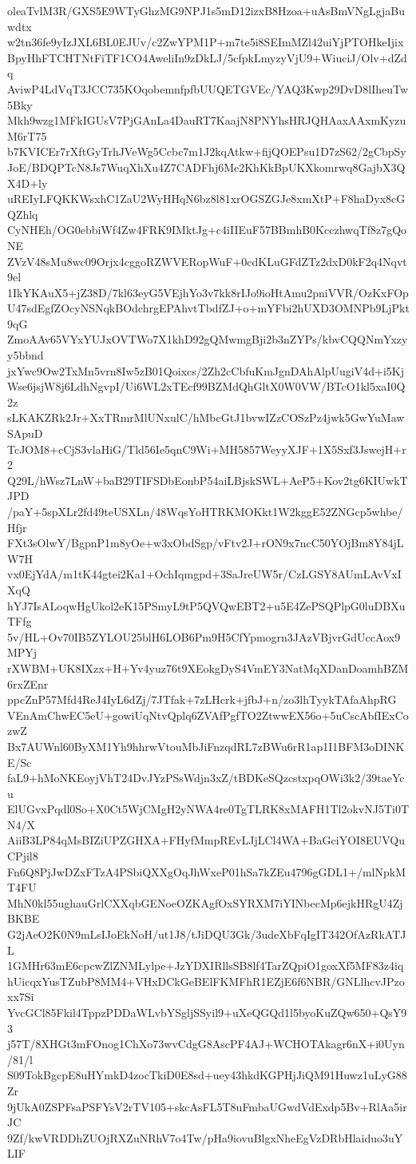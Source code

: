 oleaTvlM3R/GXS5E9WTyGhzMG9NPJ1s5mD12izxB8Hzoa+uAsBmVNgLgjaBuwdtx
w2tn36fe9yIzJXL6BL0EJUv/c2ZwYPM1P+m7te5i8SEImMZl42uiYjPTOHkeIjix
BpyHhFTCHTNtFiTF1CO4AweliIn9zDkLJ/5cfpkLmyzyVjU9+WiuciJ/Olv+dZdq
AviwP4LdVqT3JCC735KOqobemnfpfbUUQETGVEc/YAQ3Kwp29DvD8lIheuTw5Bky
Mkh9wzg1MFkIGUsV7PjGAnLa4DauRT7KaajN8PNYhsHRJQHAaxAAxmKyzuM6rT75
b7KVICEr7rXftGyTrhJVeWg5Ccbc7m1J2kqAtkw+fijQOEPsu1D7zS62/2gCbpSy
JoE/BDQPTcN8Js7WuqXhXu4Z7CADFhj6Me2KhKkBpUKXkomrwq8GajbX3QX4D+ly
uREIyLFQKKWsxhC1ZaU2WyHHqN6bz8l81xrOGSZGJe8xmXtP+F8haDyx8cGQZhlq
CyNHEh/OG0ebbiWf4Zw4FRK9IMktJg+c4iIIEuF57BBmhB0KcczhwqTf8z7gQoNE
ZVzV48sMu8wc09Orjx4cggoRZWVERopWuF+0cdKLuGFdZTz2dxD0kF2q4Nqvt9el
1IkYKAuX5+jZ38D/7kl63eyG5VEjhYo3v7kk8rIJo9ioHtAmu2pniVVR/OzKxFOp
U47sdEgfZOcyNSNqkBOdchrgEPAhvtTbdfZJ+o+mYFbi2hUXD3OMNPb9LjPkt9qG
ZmoAAv65VYxYUJxOVTWo7X1khD92gQMwmgBji2b3nZYPs/kbvCQQNmYxzyy5bbnd
jxYwc9Ow2TxMn5vrn8Iw5zB01Qoixcs/2Zh2cCbfuKmJgnDAhAlpUugiV4d+i5Kj
Wse6jsjW8j6LdhNgvpI/Ui6WL2xTEcf99BZMdQhGltX0W0VW/BTcO1kl5xaI0Q2z
sLKAKZRk2Jr+XxTRmrMlUNxulC/hMbcGtJ1bvwIZzCOSzPz4jwk5GwYuMawSApuD
TcJOM8+cCjS3vlaHiG/Tld56Ie5qnC9Wi+MH5857WeyyXJF+1X5Sxf3JswejH+r2
Q29L/hWsz7LnW+baB29TIFSDbEonbP54aiLBjskSWL+AeP5+Kov2tg6KIUwkTJPD
/paY+5spXLr2fd49teUSXLn/48WqsYoHTRKMOKkt1W2kggE52ZNGcp5whbe/Hfjr
FXt3sOlwY/BgpnP1m8yOe+w3xObdSgp/vFtv2J+rON9x7ncC50YOjBm8Y84jLW7H
vx0EjYdA/m1tK44gtei2Ka1+OchIqmgpd+3SaJreUW5r/CzLGSY8AUmLAvVxIXqQ
hYJ7IsALoqwHgUkol2eK15PSmyL9tP5QVQwEBT2+u5E4ZePSQPlpG0luDBXuTFfg
5v/HL+Ov70IB5ZYLOU25blH6LOB6Pm9H5CfYpmogrn3JAzVBjvrGdUccAox9MPYj
rXWBM+UK8IXzx+H+Yv4yuz76t9XEokgDyS4VmEY3NatMqXDanDoamhBZM6rxZEnr
ppcZnP57Mfd4ReJ4IyL6dZj/7JTfak+7zLHcrk+jfbJ+n/zo3lhTyykTAfaAhpRG
VEnAmChwEC5eU+gowiUqNtvQplq6ZVAfPgfTO2ZtwwEX56o+5uCscAbfIExCozwZ
Bx7AUWnl60ByXM1Yh9hhrwVtouMbJiFnzqdRL7zBWu6rR1ap1I1BFM3oDINKE/Sc
faL9+hMoNKEoyjVhT24DvJYzPSsWdjn3xZ/tBDKeSQzcstxpqOWi3k2/39taeYcu
ElUGvxPqdl0So+X0Ct5WjCMgH2yNWA4re0TgTLRK8xMAFH1Tl2okvNJ5Ti0TN4/X
AiiB3LP84qMsBIZiUPZGHXA+FHyfMmpREvLJjLCl4WA+BaGciYOI8EUVQuCPjil8
Fn6Q8PjJwDZxFTzA4PSbiQXXgOqJhWxeP01hSa7kZEu4796gGDL1+/mlNpkMT4FU
MhN0kl55ughauGrlCXXqbGENoeOZKAgfOxSYRXM7iYINbecMp6ejkHRgU4ZjBKBE
G2jAeO2K0N9mLsIJoEkNoH/ut1J8/tJiDQU3Gk/3udeXbFqIgIT342OfAzRkATJL
1GMHr63mE6cpcwZlZNMLylpe+JzYDXIRllsSB8lf4TarZQpiO1goxXf5MF83z4iq
hUicqxYusTZubP8MM4+VHxDCkGeBElFKMFhR1EZjE6f6NBR/GNLlhcvJPzoxx7Si
YvcGCl85Fkil4TppzPDDaWLvbYSgljSSyil9+uXeQGQd1l5byoKuZQw650+QsY93
j57T/8XHGt3mFOnog1ChXo73wvCdgG8AscPF4AJ+WCHOTAkagr6nX+i0Uyn/81/l
S09TokBgcpE8uHYmkD4zocTkiD0E8sd+uey43hkdKGPHjJiQM91Huwz1uLyG88Zr
9jUkA0ZSPFsaPSFYsV2rTV105+skcAsFL5T8uFmbaUGwdVdExdp5Bv+RlAa5irJC
9Zf/kwVRDDhZUOjRXZuNRhV7o4Tw/pHa9iovuBlgxNheEgVzDRbHlaiduo3uYLIF
